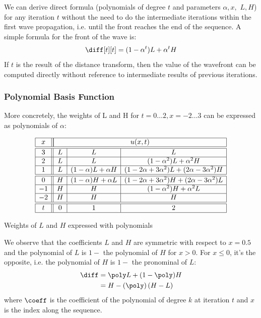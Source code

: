 We can derive direct formula (polynomials of degree $t$ and parameters $\alpha, x,$
$L, H$) for any iteration $t$ without the need to do the intermediate 
iterations within the first wave propagation, i.e. until the front reaches the end 
of the sequence. A simple formula for the front of the wave is:
%
\begin{equation}
    \diff[t][t] = (1 - \alpha^t)L + \alpha^t H
    \label{eq:wavefront}
\end{equation}
%
If $t$ is the result of the distance transform, then the value of the wavefront can be
computed directly without reference to intermediate results of previous iterations.

\subsubsection{Polynomial Basis Function}

More concretely, the weights of L and H for $t=0\ldots2,x=-2\ldots3$ can be expressed 
as polynomials of $\alpha$:

\begin{table}[ht]
    \small
    \centering
    $$
        \begin{array}{|c||c|c|c|} \hline
         x & \multicolumn{3}{|c|}{u(x,t)} \\ \hline \hline
         3 & L &          L           &                     L                       \\ \hline
         2 & L &          L           &         (1-\alpha^2)L+\alpha^2H             \\ \hline
         1 & L & (1-\alpha)L+\alpha H & (1-2\alpha+3\alpha^2)L+(2\alpha-3\alpha^2)H \\ \hline \hline
         0 & H & (1-\alpha)H+\alpha L & (1-2\alpha+3\alpha^2)H+(2\alpha-3\alpha^2)L \\ \hline
        -1 & H &          H           &         (1-\alpha^2)H+\alpha^2L             \\ \hline
        -2 & H &          H           &                     H                       \\ \hline \hline
        t  & 0 &          1           &                     2                       \\ \hline
        \end{array}
    $$
    \caption{Weights of $L$ and $H$ expressed with polynomials}
    \label{tab:weight_poly}
\end{table}

We observe that the coefficients $L$ and $H$ are symmetric with respect to $x=0.5$ and 
the polynomial of $L$ is $1-$ the polynomial of $H$ for $x>0$. For $x\le0$, it's the 
opposite, i.e. the polynomial of $H$ is $1-$ the pronominal of $L$:
%
\begin{equation}
    \begin{split}
        \diff & = \poly L + (1 - \poly) H \\
              & = H - \left(\poly \right) (H-L)
    \end{split}
    \label{eq:polynomial}
\end{equation}
%
where $\coeff$ is the coefficient of the polynomial of degree $k$ at iteration $t$ and
$x$ is the index along the sequence.

